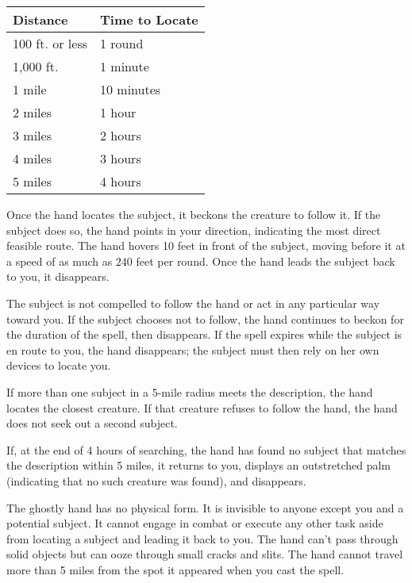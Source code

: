 \begin{multicols}{2}
\begin{small}
\begin{center}
\begin{tabular}[h!]{l|l}
Distance & Time to Locate \\ \hline
100 ft. or less & 1 round \\
1,000 ft. & 1 minute \\
1 mile & 10 minutes \\
2 miles & 1 hour \\
3 miles & 2 hours	\\
4 miles & 3 hours	\\
5 miles & 4 hours \\
\end{tabular}
\end{center}

\smallskip\noindent Once the hand locates the subject, it beckons the creature to follow it. If the subject does so, the hand points in your direction, indicating the most direct feasible route. The hand hovers 10 feet in front of the subject, moving before it at a speed of as much as 240 feet per round. Once the hand leads the subject back to you, it disappears.

\smallskip\noindent The subject is not compelled to follow the hand or act in any particular way toward you. If the subject chooses not to follow, the hand continues to beckon for the duration of the spell, then disappears. If the spell expires while the subject is en route to you, the hand disappears; the subject must then rely on her own devices to locate you.

\smallskip\noindent If more than one subject in a 5-mile radius meets the description, the hand locates the closest creature. If that creature refuses to follow the hand, the hand does not seek out a second subject.

\smallskip\noindent If, at the end of 4 hours of searching, the hand has found no subject that matches the description within 5 miles, it returns to you, displays an outstretched palm (indicating that no such creature was found), and disappears.

\smallskip\noindent The ghostly hand has no physical form. It is invisible to anyone except you and a potential subject. It cannot engage in combat or execute any other task aside from locating a subject and leading it back to you. The hand can't pass through solid objects but can ooze through small cracks and slits. The hand cannot travel more than 5 miles from the spot it appeared when you cast the spell.


\end{small}
\end{multicols}
